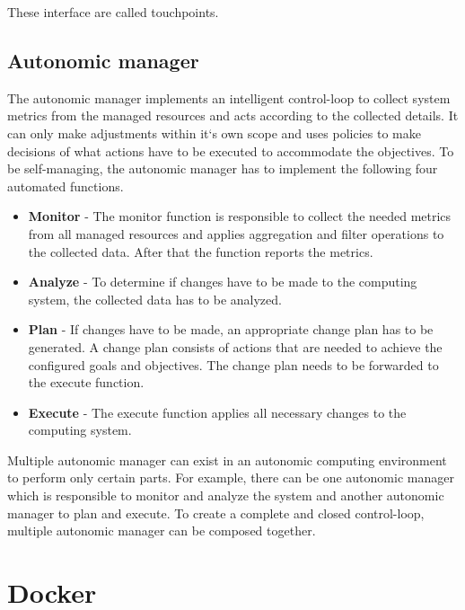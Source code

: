 These interface are called touchpoints.

\subsection{Autonomic manager}
The autonomic manager implements an intelligent control-loop to collect system metrics from the managed resources and acts according to the collected details. It can only make adjustments within it`s own scope and uses policies to make decisions of what actions have to be
executed to accommodate the objectives.
To be self-managing, the autonomic manager has to implement the following four automated functions.

\begin{itemize}
\item \textbf{Monitor}
- The monitor function is responsible to collect the needed metrics from all managed resources and applies aggregation and filter
operations to the collected data. After that the function reports the metrics.

\item \textbf{Analyze}
- To determine if changes have to be made to the computing system, the collected data has to be analyzed.

\item \textbf{Plan}
- If changes have to be made, an appropriate change plan has to be generated. A change plan consists of actions that are needed to achieve the configured goals and objectives. The change plan needs to be forwarded to the execute function.

\item \textbf{Execute}
- The execute function applies all necessary changes to the computing system.

\end{itemize}

Multiple autonomic manager can exist in an autonomic computing environment to perform only certain parts. For example, 
there can be one autonomic manager which is responsible to monitor and analyze the system and another autonomic manager 
to plan and execute. To create a complete and closed control-loop, multiple autonomic manager can be composed together.


\section{Docker}


